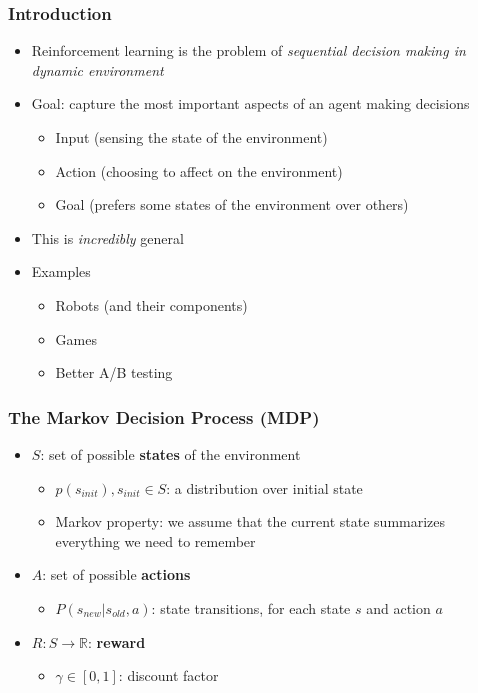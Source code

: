 \documentclass{beamer}
\begin{document}
\begin{frame}
\frametitle{Introduction}
\begin{itemize}
  \item Reinforcement learning is the problem of \textit{sequential decision making in dynamic environment}
  \item Goal: capture the most important aspects of an agent making decisions
    \begin{itemize}
      \item Input (sensing the state of the environment)
      \item Action (choosing to affect on the environment)
      \item Goal (prefers some states of the environment over others)
    \end{itemize}
  \item This is \textit{incredibly} general
  \item Examples
    \begin{itemize}
      \item Robots (and their components)
      \item Games
      \item Better A/B testing
    \end{itemize}
\end{itemize}
\end{frame}

\begin{frame}
  \frametitle{The Markov Decision Process (MDP)}
  \begin{itemize}
    \item $S$: set of possible \textbf{states} of the environment
      \begin{itemize}
        \item $p(s_{init}), s_{init} \in S$: a distribution over initial state
        \item Markov property: we assume that the current state summarizes everything we need to remember
      \end{itemize}
    \item $A$: set of possible \textbf{actions}
      \begin{itemize}
        \item $P(s_{new} | s_{old}, a)$: state transitions, for each state $s$ and action $a$
      \end{itemize}
    \item $R: S \rightarrow \mathbb{R}$: \textbf{reward}
      \begin{itemize}
        \item $\gamma \in [0,1]$: discount factor
      \end{itemize}
  \end{itemize}
\end{frame}
\end{document}
